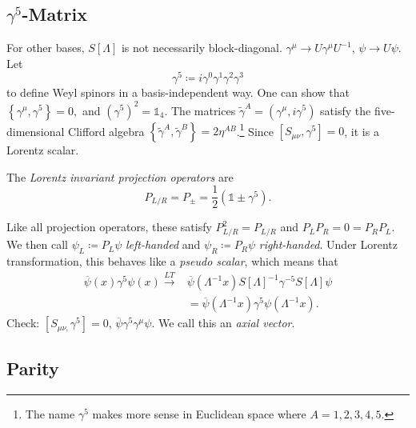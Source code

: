 \subsection{\texorpdfstring{$\gamma^5$-}{Gamma five }Matrix}%
\label{sub:gamma_five_matrix}

For other bases, $S[\Lambda]$ is not necessarily block-diagonal.
$\gamma^{\mu} \to U \gamma^{\mu} U^{-1}$, $\psi \to U \psi$. Let 
\begin{equation}
  \gamma^5 \coloneqq i \gamma^0 \gamma^1 \gamma^2 \gamma^3
\end{equation}
to define Weyl spinors in a basis-independent way.
One can show that $ \left\{ \gamma^{\mu}, \gamma^5 \right\} = 0,$ and $(\gamma^5)^2 = \mathbb{1}_4$.
The matrices $\widetilde{\gamma}^{A} = (\gamma^{\mu}, i \gamma^5)$ satisfy the five-dimensional Clifford algebra $\left\{ \widetilde{\gamma}^{A}, \widetilde{\gamma}^{B} \right\} = 2 \eta^{AB}$.\footnote{The name $\gamma^5$ makes more sense in Euclidean space where $A = 1, 2,3,4, 5$.}
Since $[S_{\mu\nu}, \gamma^5] = 0$, it is a Lorentz scalar.
\begin{definition}[]
  The \emph{Lorentz invariant projection operators} are
  \begin{equation}
    P_{L / R} = P_{\pm} = \frac{1}{2} (\mathbb{1} \pm \gamma^5).
  \end{equation}
\end{definition}
Like all projection operators, these satisfy $P_{L/R}^2 = P_{L/R}$ and $P_L P_R = 0 = P_R P_L$.
We then call $\psi_L \coloneqq P_L \psi$ \emph{left-handed} and $\psi_R \coloneqq P_R \psi$ \emph{right-handed}.
Under Lorentz transformation, this behaves like a \emph{pseudo scalar}, which means that
\begin{align}
  \overline{\psi}(x) \gamma^5 \psi(x) \xrightarrow{LT} &\overline{\psi}(\Lambda^{-1}x) S[\Lambda]^{-1} \gamma^{-5} S[\Lambda] \psi \\
						       &=\overline{\psi}(\Lambda^{-1} x) \gamma^5 \psi (\Lambda^{-1} x).
\end{align}
Check: $[S_{\mu\nu,} \gamma^5] = 0$, $\overline{\psi}\gamma^5 \gamma^{\mu} \psi$. We call this an \emph{axial vector}.

\subsection{Parity}%
\label{sub:parity}

